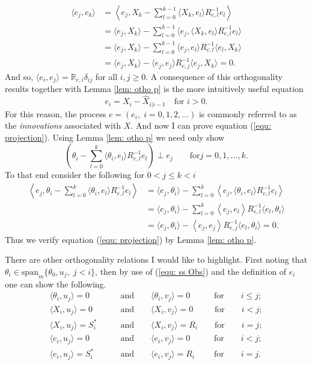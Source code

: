 \documentclass[12pt]{amsart}
\renewcommand{\and}{\qquad\text{and}\qquad}
\newcommand{\R}{\mathbb{R}}
\renewcommand{\and}{\qquad\text{and}\qquad }
\begin{document}
\begin{align*}
\langle e_j,e_k \rangle &= \left\langle e_j,X_k - \sum_{l=0}^{k-1}\langle X_k,e_l\rangle R_{e,l}^{-1} e_l \right\rangle\\
&= \langle e_j,X_k\rangle - \sum_{l=0}^{k-1} \langle e_j,\langle X_k,e_l\rangle R_{e,l}^{-1} e_l \rangle\\
&= \langle e_j,X_k\rangle - \sum_{l=0}^{k-1} \langle e_j,e_l \rangle R_{e,l}^{-1} \langle e_l,X_k\rangle \\
&= \langle e_j,X_k\rangle - \langle e_j,e_j \rangle R_{e,j}^{-1} \langle e_j,X_k\rangle = 0.
\end{align*}
And so, $\langle e_i,e_j \rangle = \R_{e,i}\delta_{ij}$ for all $i,j \ge 0$. A consequence of this orthogonality results together with Lemma \ref{lem: otho p} is the more intuitively useful equation
$$e_i = X_i - \hat{X}_{i|i-1}\quad \text{for }i>0.$$
For this reason, the process $e = (e_i,\; i= 0, 1, 2,\dots)$ is commonly referred to as the \textit{innovations} associated with $X$. 
And now I can prove equation (\ref{equ: projection}). Using Lemma \ref{lem: otho p} we need only show $$\left(\theta_{i} - \sum_{l=0}^k \langle \theta_{i}, e_l \rangle R^{-1}_{e,l} e_l\right)\perp e_j \qquad \text{for} j = 0, 1, \dots, k.$$
To that end consider the following for $0 < j \le k<i$
\begin{align*}
\left\langle e_j, \theta_{i} - \sum_{l=0}^k \langle \theta_{i}, e_l \rangle R^{-1}_{e,l} e_l\right\rangle &= \langle e_j, \theta_i \rangle - \sum_{l=0}^k \left\langle e_j,\langle \theta_{i}, e_l \rangle R^{-1}_{e,l} e_l\right\rangle\\
&= \langle e_j, \theta_i \rangle - \sum_{l=0}^k \left\langle e_j,e_l\right\rangle R^{-1}_{e,l}\langle  e_l, \theta_{i}\rangle  \\
&= \langle e_j, \theta_i \rangle - \left\langle e_j,e_j\right\rangle R^{-1}_{e,j}\langle  e_l, \theta_{i}\rangle = 0.
\end{align*}
Thus we verify equation (\ref{equ: projection}) by Lemma \ref{lem: otho p}.

There are other orthogonality relations I would like to highlight. First noting that $\theta_i \in \text{span}_m\{\theta_0, u_j,\; j<i\}$, then by use of (\ref{equ: ss Obs}) and the definition of $e_i$ one can show the following.
\begin{subequations}
	\label{equ: inner p}
\begin{align}
\langle \theta_i, u_j \rangle = 0 &\and \langle \theta_i, v_j \rangle = 0 \qquad\;\;\;\text{for}\qquad i\le j;\\
\label{equ: inner p b}\langle X_i, u_j \rangle = 0 &\and \langle X_i, v_j \rangle = 0 \qquad\;\;\text{for}\qquad i < j;\\
\langle X_i, u_j \rangle = S^*_i &\and \langle X_i, v_j \rangle = R_i \qquad\text{for}\qquad i = j;\\ 
\langle e_i, u_j \rangle = 0 &\and \langle e_i, v_j \rangle = 0 \qquad\;\;\;\text{for}\qquad i < j;\\
\label{equ: inner p e} \langle e_i, u_j \rangle = S^*_i &\and \langle e_i, v_j \rangle = R_i \qquad\;\text{for}\qquad i = j.
\end{align}
\end{subequations}
\end{document}
